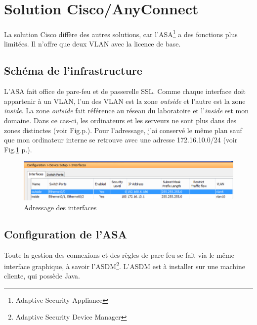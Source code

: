 \section{Solution Cisco/AnyConnect}
La solution Cisco diffère des autres solutions, car l'ASA\footnote{Adaptive Security Appliance} a des fonctions plus limitées.
Il n'offre que deux VLAN avec la licence de base.

\subsection{Schéma de l'infrastructure}
L'ASA fait office de pare-feu et de passerelle SSL.
Comme chaque interface doit appartenir à un VLAN, l'un des VLAN est la zone \textit{outside} et l'autre est la zone \textit{inside}.
La zone \textit{outside} fait référence au réseau du laboratoire et l'\textit{inside} est mon domaine.
Dans ce cas-ci, les ordinateurs et les serveurs ne sont plus dans des zones distinctes (voir Fig.p.).
Pour l'adressage, j'ai conservé le même plan sauf que mon ordinateur interne se retrouve avec une adresse 172.16.10.0/24 (voir Fig.\ref{fig:ifCisco} p.\pageref{fig:ifCisco}).
\begin{figure}[ht]
	\centering
	\includegraphics[width=16cm]{Cisco/interfaces.png}
	\caption{Adressage des interfaces}
	\label{fig:ifCisco}
\end{figure}

\subsection{Configuration de l'ASA}
Toute la gestion des connexions et des règles de pare-feu se fait via le même interface graphique, à savoir l'ASDM\footnote{Adaptive Security Device Manager}.
L'ASDM est à installer sur une machine cliente, qui possède Java.

